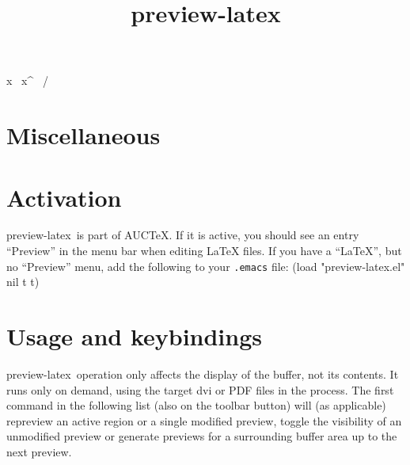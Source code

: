 \twocol
\keycs{}
\keycs{}
\keycs{}
\keycs{}
\keycs\leq{<}
\keycs\geq{>}
\keycs\tilde x{\string~}
\keycs\hat x{^}
\keycs{}
\keycs{}
\keycs{}
\keycs{}
\keycs\not \ {/}
\keycs{}
\keycs\times{*}
\keycs{}
\keycs\colon{:}
\keycs\subset{\{}
\keycs\supset{\}}
\keycs\subseteq{[}
\keycs\supseteq{]}
\keycs{}
\keycs\setminus{\\}
\keycs\cup{+}
\keycs\cap{-}
\keycs\langle{(}
\keycs\rangle{)}
\keycs{}
\keycs{}
\keycs{}
\keycs{}
\keycs{}
\keycs{}
\keycs{}
\keycs{}
\keycs\vee{|}
\keycs\wedge{\&}

\section{Miscellaneous}


\newcolumn

\def\previewlatex{{preview-latex}}
\title{\previewlatex}
\section{Activation}
\previewlatex\ is part of AUC\TeX.  If it is active, you should see an
entry ``Preview'' in the menu bar when editing \LaTeX{} files.  If you
have a ``LaTeX'', but no ``Preview'' menu, add the following to your
{\tt .emacs} file:
\beginexample
(load "preview-latex.el" nil t t)
\endexample

\section{Usage and keybindings}
\previewlatex\ operation only affects the display of the buffer, not
its contents.  It runs only on demand, using the target {\sc dvi} or
{\sc PDF} files in the process.  The first command in the following
list (also on the toolbar button) will (as applicable) repreview an
active region or a single modified preview, toggle the visibility of
an unmodified preview or generate previews for a surrounding buffer
area up to the next preview.


